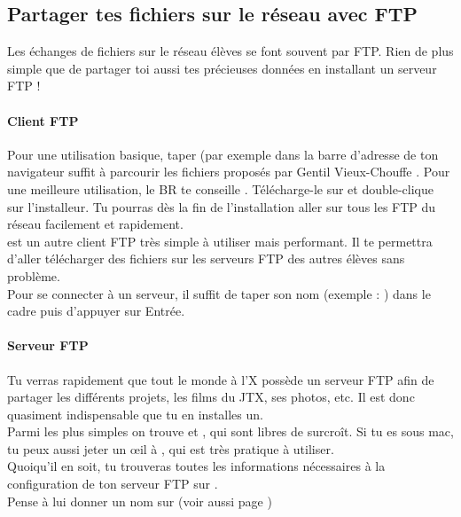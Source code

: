 \subsection{Partager tes fichiers sur le r\'eseau avec FTP}

Les \'echanges de fichiers sur le r\'eseau \'el\`eves se font souvent par FTP. Rien de plus simple que de partager toi aussi tes pr\'ecieuses donn\'ees en installant un serveur FTP !

\paragraph{Client FTP}
Pour une utilisation basique, taper   (par exemple  dans la barre d'adresse de ton navigateur suffit \`a parcourir les fichiers propos\'es par \og Gentil Vieux-Chouffe \fg.
Pour une meilleure utilisation, le BR te conseille . T\'el\'echarge-le sur  et double-clique sur l'installeur.
Tu pourras d\`es la fin de l'installation aller sur tous les FTP du r\'eseau facilement et rapidement.\\
  est un autre client FTP tr\`es simple \`a  utiliser mais performant. Il te permettra d'aller t\'el\'echarger des fichiers sur les serveurs FTP des autres \'el\`eves sans probl\`eme.\\
Pour se connecter \`a  un serveur, il suffit de taper son nom (exemple : ) dans le cadre  puis d'appuyer sur Entr\'ee.\\


\paragraph{Serveur FTP}
Tu verras rapidement que tout le monde \`a  l'X poss\`ede un serveur FTP
afin de partager les diff\'erents projets, les films du JTX, ses
photos, etc. Il est donc quasiment indispensable que tu en installes un.\\

Parmi les plus simples on trouve  et , qui sont libres de surcro\^{i}t.
Si tu es sous mac, tu peux aussi jeter un \oe{}il à , qui est très pratique à utiliser.\\
Quoiqu'il en soit, tu trouveras toutes les informations n\'ecessaires \`a la configuration de ton serveur FTP sur .\\
Pense \`a lui donner un nom sur  (voir aussi page \pageref{dnsapp})
